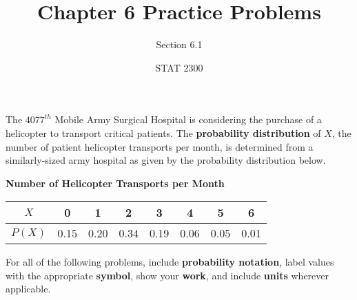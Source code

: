 \documentclass[noanswers]{exam}
\title{Chapter 6 Practice Problems}
\author{Section 6.1}
\date{STAT 2300}
\begin{document}
%

\noindent The $4077^{th}$ Mobile Army Surgical Hospital is considering the purchase of a helicopter to transport critical patients. The \textbf{probability distribution} of $X$, the number of patient helicopter transports per month, is determined from a similarly-sized army hospital as given by the probability distribution below.

\vspace{3mm}

\begin{center}
    \textbf{Number of Helicopter Transports per Month}
    
    \vspace{1mm}
    
    \begin{tabular}{| c | c | c | c | c | c | c | c |}
        \hline
        $X$ & 0 & 1 & 2 & 3 & 4 & 5 & 6 \\
         \hline
        $P(X)$ & 0.15 & 0.20 & 0.34 & 0.19 & 0.06 & 0.05 & 0.01 \\
         \hline
    \end{tabular}
	\end{center}
\vspace{3mm}

\noindent For all of the following problems, include \textbf{probability notation}, label values with the appropriate \textbf{symbol}, show your \textbf{work}, and include \textbf{units} wherever applicable.

\vspace{3mm}
\end{document}
